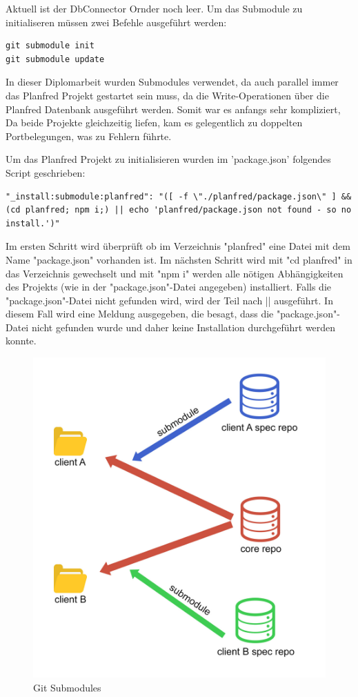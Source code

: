 Aktuell ist der DbConnector Ornder noch leer. Um das Submodule zu initialiseren müssen zwei Befehle ausgeführt werden:

\begin{lstlisting}
git submodule init
git submodule update
\end{lstlisting}

In dieser Diplomarbeit wurden Submodules verwendet, da auch parallel immer das Planfred Projekt gestartet sein muss, da die Write-Operationen über die Planfred Datenbank ausgeführt werden. Somit war es anfangs sehr kompliziert, Da beide Projekte gleichzeitig liefen, kam es gelegentlich zu doppelten Portbelegungen, was zu Fehlern führte.

Um das Planfred Projekt zu initialisieren wurden im 'package.json' folgendes Script geschrieben:

\begin{lstlisting}
"_install:submodule:planfred": "([ -f \"./planfred/package.json\" ] && (cd planfred; npm i;) || echo 'planfred/package.json not found - so no install.')"
\end{lstlisting}

Im ersten Schritt wird überprüft ob im Verzeichnis "planfred" eine Datei mit dem Name "package.json" vorhanden ist. Im nächsten Schritt wird mit "cd planfred" in das Verzeichnis gewechselt und mit "npm i" werden alle nötigen Abhängigkeiten des Projekts (wie in der "package.json"-Datei angegeben) installiert. Falls die "package.json"-Datei nicht gefunden wird, wird der Teil nach || ausgeführt. In diesem Fall wird eine Meldung ausgegeben, die besagt, dass die "package.json"-Datei nicht gefunden wurde und daher keine Installation durchgeführt werden konnte.

\begin{figure}[h!]
    \centering
    \includegraphics[width=0.6\linewidth]{pics/git-submodules.jpg}
    \caption{Git Submodules}
    \label{fig:enter-label}
\end{figure}





